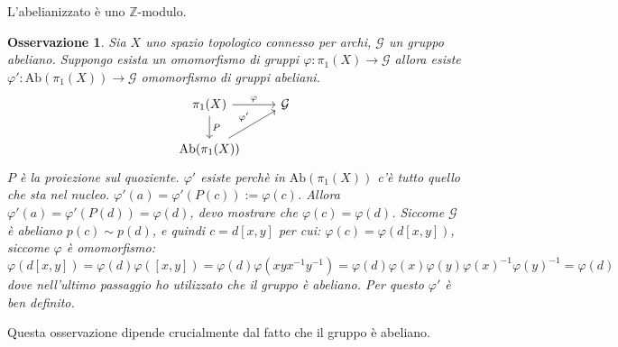\documentclass[10pt, twoside=false, x11names]{scrbook}
\newtheorem{osservation}[theorem]{Osservazione}
\newcommand{\Z}{\mathbb{Z}}
\renewcommand{\phi}{\varphi}
\newcommand{\Ab}[1]{\mathrm{Ab}( #1 )}
\begin{document}
L'abelianizzato è uno $ \Z $-modulo.

\begin{osservation}
  Sia $ X $ uno spazio topologico connesso per archi, $ \mathcal{G} $ un gruppo abeliano. Suppongo esista un omomorfismo
  di gruppi $ \phi: \pi_1(X) \to \mathcal{G} $ allora esiste $ \phi' : \Ab{\pi_1(X)} \to \mathcal{G} $ omomorfismo di gruppi abeliani.
  \[
    \begin{tikzcd}
      \pi_1(X) \arrow{r}{\phi} \arrow{d}{P} & \mathcal{G} \\
      \Ab{\pi_1(X)} \arrow{ur}{\phi'}
    \end{tikzcd}
  \]
  $ P $ è la proiezione sul quoziente. $ \phi' $ esiste perchè in $ \Ab{\pi_1(X)} $ c'è tutto quello che sta nel nucleo.
  $ \phi'(a) = \phi'(P(c)) := \phi(c) $.
  Allora $ \phi'(a) = \phi'(P(d)) = \phi(d) $, devo mostrare che $ \phi(c) = \phi(d) $. Siccome $ \mathcal{G} $ è abeliano $ p(c) \sim p(d) $,
  e quindi $ c = d[x,y] $ per cui: $ \phi(c) = \phi(d[x,y]) $, siccome $ \phi $ è omomorfismo:
  \[
    \phi(d[x,y]) = \phi(d)\phi([x,y]) = \phi(d) \phi(xyx^{-1}y^{-1}) = \phi(d) \phi(x) \phi(y) \phi(x)^{-1} \phi(y)^{-1} = \phi(d)
  \]
  dove nell'ultimo passaggio ho utilizzato che il gruppo è abeliano. Per questo $ \phi' $ è ben definito.
\end{osservation}
Questa osservazione dipende crucialmente dal fatto che il gruppo è abeliano.
\end{document}
